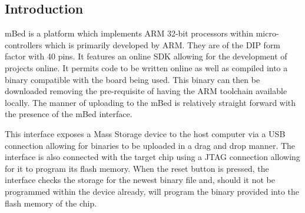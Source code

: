 
\subsection{Introduction}

mBed is a platform which implements ARM 32-bit processors within micro-controllers which is primarily developed by ARM. They are of the DIP form factor with 40 pins. It features an online SDK allowing for the development of projects online. It permits code to be written online as well as compiled into a binary compatible with the board being used. This binary can then be downloaded removing the pre-requisite of having the ARM toolchain available locally. The manner of uploading to the mBed is relatively straight forward with the presence of the mBed interface. \cite{mbed_website}

This interface exposes a Mass Storage device to the host computer via a USB connection allowing for binaries to be uploaded in a drag and drop manner. The interface is also connected with the target chip using a JTAG connection allowing for it to program its flash memory. When the reset button is pressed, the interface checks the storage for the newest binary file and, should it not be programmed within the device already, will program the binary provided into the flash memory of the chip. \cite{mbed_website}


